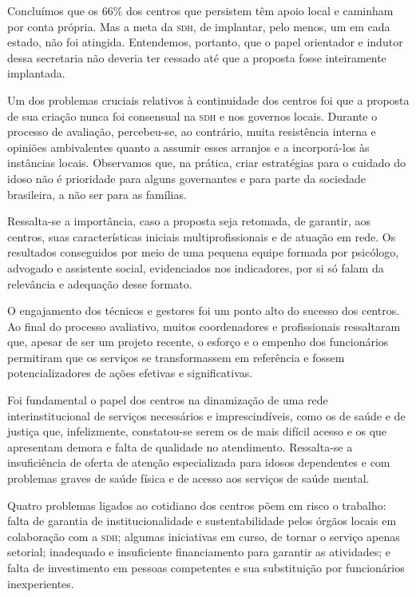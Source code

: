 \documentclass{article}
\begin{document}
Concluímos que os 66\% dos centros que persistem têm apoio local e caminham por
conta própria. Mas a meta da \textsc{sdh}, de implantar, pelo menos, um em cada estado,
não foi atingida. Entendemos, portanto, que o papel orientador e indutor dessa
secretaria não deveria ter cessado até que a proposta fosse inteiramente
implantada.

Um dos problemas cruciais relativos à continuidade dos centros foi que a
proposta de sua criação nunca foi consensual na \textsc{sdh} e nos governos locais.
Durante o processo de avaliação, percebeu-se, ao contrário, muita resistência
interna e opiniões ambivalentes quanto a assumir esses arranjos e a
incorporá-los às instâncias locais. Observamos que, na prática, criar
estratégias para o cuidado do idoso não é prioridade para alguns governantes e
para parte da sociedade brasileira, a não ser para as famílias.

Ressalta-se a importância, caso a proposta seja retomada, de garantir, aos
centros, suas características iniciais multiprofissionais e de atuação em rede.
Os resultados conseguidos por meio de uma pequena equipe formada por psicólogo,
advogado e assistente social, evidenciados nos indicadores, por si só falam da
relevância e adequação desse formato.

O engajamento dos técnicos e gestores foi um ponto alto do sucesso dos centros.
Ao final do processo avaliativo, muitos coordenadores e profissionais
ressaltaram que, apesar de ser um projeto recente, o esforço e o empenho dos
funcionários permitiram que os serviços se transformassem em referência e fossem
potencializadores de ações efetivas e significativas.

Foi fundamental o papel dos centros na dinamização de uma rede
interinstitucional de serviços necessários e imprescindíveis, como os de saúde e
de justiça que, infelizmente, constatou-se serem os de mais difícil acesso e os
que apresentam demora e falta de qualidade no atendimento. Ressalta-se a
insuficiência de oferta de atenção especializada para idosos dependentes e com
problemas graves de saúde física e de acesso aos serviços de saúde mental.

Quatro problemas ligados ao cotidiano dos centros põem em risco o trabalho:
falta de garantia de institucionalidade e sustentabilidade pelos órgãos locais
em colaboração com a \textsc{sdh}; algumas iniciativas em curso, de tornar o serviço
apenas setorial; inadequado e insuficiente financiamento para garantir as
atividades; e falta de investimento em pessoas competentes e sua substituição
por funcionários inexperientes.
\end{document}
